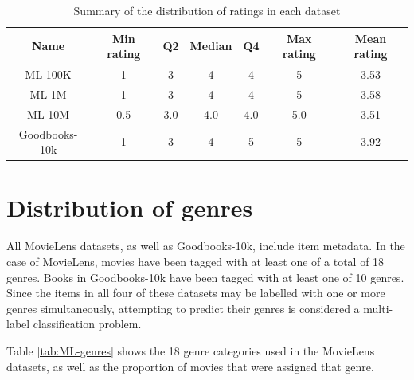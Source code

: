\begin{table}[H]
\centering
\begin{tabular}{c | c | c | c | c | c | c}
\toprule
\textbf{Name} & \textbf{Min rating} & \textbf{Q2} & \textbf{Median} & \textbf{Q4} & \textbf{Max rating} & \textbf{Mean rating} \\
\midrule
ML 100K & 1 & 3 & 4 & 4 & 5 & 3.53 \\
ML 1M & 1 & 3 & 4 & 4 & 5 & 3.58 \\
ML 10M & 0.5 & 3.0 & 4.0 & 4.0 & 5.0 & 3.51 \\
Goodbooks-10k & 1 & 3 & 4 & 5 & 5 & 3.92 \\
\bottomrule
\end{tabular}
\caption[5-number of summaries of ratings]{Summary of the distribution of ratings in each dataset}
\label{tab:ratings-5-number-summaries}
\end{table}

\section{Distribution of genres}
All MovieLens datasets, as well as Goodbooks-10k, include item metadata. In the case of MovieLens, movies have been tagged with at least one of a total of 18 genres. Books in Goodbooks-10k have been tagged with at least one of 10 genres. Since the items in all four of these datasets may be labelled with one or more genres simultaneously, attempting to predict their genres is considered a multi-label classification problem.

Table \ref{tab:ML-genres} shows the 18 genre categories used in the MovieLens datasets, as well as the proportion of movies that were assigned that genre.

